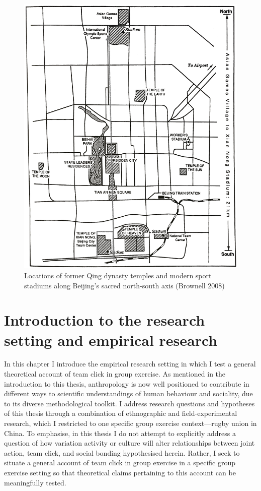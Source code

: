 \begin{CJK}{UTF8}{gbsn}
\begin{figure}[htbp]
    \centering
  \includegraphics[scale =.1]{images/beijingTemplesXNT.png}
  \caption{Locations of former Qing dynasty temples and modern sport stadiums along Beijing's sacred north-south axis (Brownell 2008)}
  \label{fig:beijingTemplesXNT}
\end{figure}



\section{Introduction to the research setting and empirical research}

In this chapter I introduce the empirical research setting in which I test a general theoretical account of team click in group exercise.  As mentioned in the introduction to this thesis, anthropology is now well positioned to contribute in different ways to scientific understandings of human behaviour and sociality, due to its diverse methodological toolkit.  I address research questions and hypotheses of this thesis through a combination of ethnographic and field-experimental research, which I restricted to one specific group exercise context—rugby union in China.  To emphasise, in this thesis I do not attempt to explicitly address a question of how variation activity or culture will alter relationships between joint action, team click, and social bonding hypothesised herein.  Rather, I seek to situate a general account of team click in group exercise in a specific group exercise setting so that theoretical claims pertaining to this account can be meaningfully tested.



\end{CJK}
